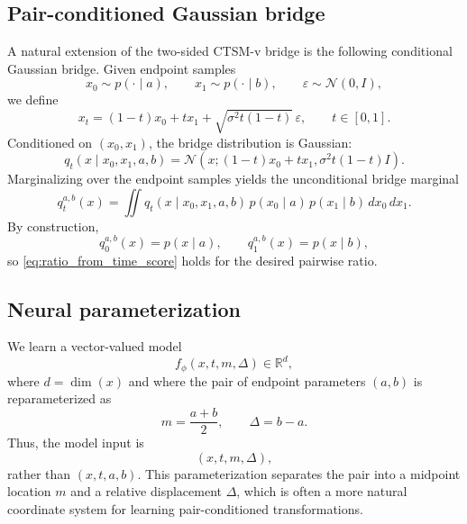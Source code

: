 \subsection{Pair-conditioned Gaussian bridge}

A natural extension of the two-sided CTSM-v bridge is the following conditional Gaussian bridge. Given endpoint samples
\begin{equation}
    x_0 \sim p(\cdot \mid a),
    \qquad
    x_1 \sim p(\cdot \mid b),
    \qquad
    \varepsilon \sim \mathcal{N}(0, I),
\end{equation}
we define
\begin{equation}
    x_t
    =
    (1-t)x_0 + t x_1 + \sqrt{\sigma^2 t(1-t)}\, \varepsilon,
    \qquad t \in [0,1].
    \label{eq:twosb_bridge}
\end{equation}
Conditioned on $(x_0, x_1)$, the bridge distribution is Gaussian:
\begin{equation}
    q_t(x \mid x_0, x_1, a,b)
    =
    \mathcal{N}\!
    \left(
        x;
        (1-t)x_0 + t x_1,
        \sigma^2 t(1-t) I
    \right).
\end{equation}
Marginalizing over the endpoint samples yields the unconditional bridge marginal
\begin{equation}
    q_t^{a,b}(x)
    =
    \iint
    q_t(x \mid x_0, x_1, a,b)
    \, p(x_0\mid a)
    \, p(x_1\mid b)
    \, dx_0 \, dx_1.
    \label{eq:unconditional_bridge_marginal}
\end{equation}
By construction,
\begin{equation}
    q_0^{a,b}(x)=p(x\mid a),
    \qquad
    q_1^{a,b}(x)=p(x\mid b),
\end{equation}
so \eqref{eq:ratio_from_time_score} holds for the desired pairwise ratio.

\subsection{Neural parameterization}

We learn a vector-valued model
\begin{equation}
    f_\phi(x,t,m,\Delta) \in \mathbb{R}^d,
\end{equation}
where $d=\dim(x)$ and where the pair of endpoint parameters $(a,b)$ is reparameterized as
\begin{equation}
    m = \frac{a+b}{2},
    \qquad
    \Delta = b-a.
\end{equation}
Thus, the model input is
\begin{equation}
    (x,t,m,\Delta),
\end{equation}
rather than $(x,t,a,b)$. This parameterization separates the pair into a midpoint location $m$ and a relative displacement $\Delta$, which is often a more natural coordinate system for learning pair-conditioned transformations.

